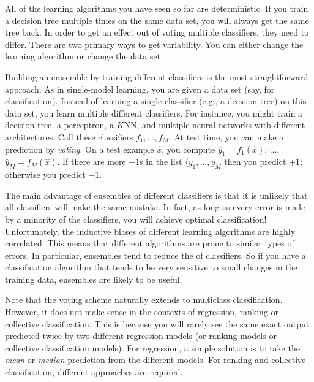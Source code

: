 All of the learning algorithms you have seen so far are
deterministic.  If you train a decision tree multiple times on the
same data set, you will always get the same tree back.  In order to
get an effect out of voting multiple classifiers, they need to
differ.  There are two primary ways to get variability.  You can
either change the learning algorithm or change the data set.

Building an emsemble by training different classifiers is the most
straightforward approach.  As in single-model learning, you are given
a data set (say, for classification).  Instead of learning a single
classifier (e.g., a decision tree) on this data set, you learn multiple
different classifiers.  For instance, you might train a decision tree,
a perceptron, a $K$NN, and multiple neural networks with different
architectures.  Call these classifiers $f_1, \dots, f_M$.  At test
time, you can make a prediction by \emph{voting}.  On a test example
$\hat x$, you compute $\hat y_1 = f_1(\hat x)$, $\dots$, $\hat y_M =
f_M(\hat x)$.  If there are more $+1$s in the list $\langle y_1,
\dots, y_M$ then you predict $+1$; otherwise you predict $-1$.

The main advantage of ensembles of different classifiers is that it is
unlikely that all classifiers will make the same mistake.  In fact, as
long as every error is made by a minority of the classifiers, you will
achieve optimal classification!  Unfortunately, the inductive biases
of different learning algorithms are highly correlated.  This means
that different algorithms are prone to similar types of errors.  In
particular, ensembles tend to reduce the  of
classifiers.  So if you have a classification algorithm that tends to
be very sensitive to small changes in the training data, ensembles are
likely to be useful.


Note that the voting scheme naturally extends to multiclass
classification.  However, it does not make sense in the contexts of
regression, ranking or collective classification.  This is because you
will rarely see the same exact output predicted twice by two different
regression models (or ranking models or collective classification
models).  For regression, a simple solution is to take the \emph{mean}
or \emph{median} prediction from the different models.  For ranking
and collective classification, different approaches are required.

